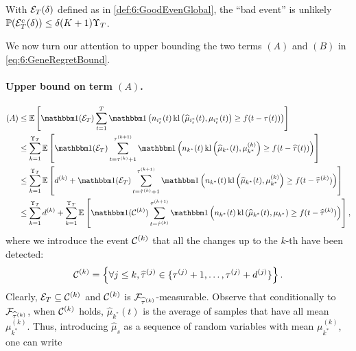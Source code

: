 \begin{lemma}\label{lem:6:GoodEventGlobal}
\begin{leftbar}[lemmabar]  %
    With $\mathcal{E}_T(\delta)$ defined as in \eqref{def:6:GoodEvenGlobal}, the ``bad event'' is unlikely
        $\mathbb{P}(\mathcal{E}_T^c(\delta)) \leq \delta(K+1)\Upsilon_T$.
\end{leftbar}  %
\end{lemma}

We now turn our attention to upper bounding the two terms $(A)$ and $(B)$ in \eqref{eq:6:GeneRegretBound}.



\paragraph{Upper bound on term $(A)$.}

\begin{align*}
    (A) & \leq \bE\left[\indic(\cE_T) \sum_{t=1}^T \indic\left(n_{i_t^*}(t) \, \kl\left(\widehat{\mu}_{i_t^*}(t), \mu_{i_t^*}(t)\right) \geq f(t - \tau(t))\right)\right] \\
     & \leq \sum_{k=1}^{\Upsilon_T}\bE\left[\indic(\cE_T) \sum_{t=\tau^{(k)}+1}^{\tau^{(k+1)}} \indic\left(n_{k^*}(t) \, \kl\left(\widehat{\mu}_{k^*}(t), \mu_{k^*}^{(k)}\right) \geq f(t - \widehat{\tau}(t))\right)\right] \\
    & \leq \sum_{k=1}^{\Upsilon_T}\bE\left[ d^{(k)} + \indic(\cE_T) \sum_{t=\hat{\tau}^{(k)}+1}^{\tau^{(k+1)}} \indic\left(n_{k^*}(t) \, \kl\left(\widehat{\mu}_{k^*}(t), \mu_{k^*}^{(k)}\right) \geq f(t - \widehat{\tau}^{(k)})\right)\right] \\
    & \leq \sum_{k=1}^{\Upsilon_T}d^{(k)} + \sum_{k=1}^{\Upsilon_T}\bE\left[\indic(\cC^{(k)}) \sum_{t=\hat{\tau}^{(k)}}^{\tau^{(k+1)}}\indic\left(n_{k^*}(t) \, \kl\left(\widehat{\mu}_{k^*}(t), \mu_{k^*}\right) \geq f(t - \widehat{\tau}^{(k)})\right)\right],
\end{align*}
%
where we introduce the event $\mathcal{C}^{(k)}$ that all the changes up to the $k$-th have been detected:
%
\begin{equation}\label{def:6:EventCiGlobal}
    \mathcal{C}^{(k)} = \left\{\forall j \leq k, \widehat{\tau}^{(j)} \in \{\tau^{(j)} + 1, \dots, \tau^{(j)} + d^{(j)} \} \right\}.
\end{equation}
%
Clearly, $\mathcal{E}_T \subseteq \mathcal{C}^{(k)}$ and $\mathcal{C}^{(k)}$ is $\mathcal{F}_{\widehat{\tau}^{(k)}}$-measurable. Observe that conditionally to $\mathcal{F}_{\widehat{\tau}^{(k)}}$, when $\mathcal{C}^{(k)}$ holds, $\widehat{\mu}_{k^*}(t)$ is the average of samples that have all mean $\mu_{k^*}^{(k)}$.
%
Thus, introducing $\widehat{\mu}_s$ as a sequence of \iid{} random variables with mean $\mu_{k^*}^{(k)}$, one can write

